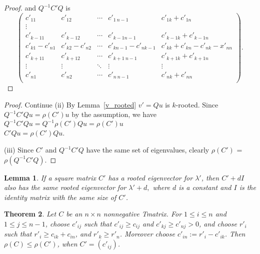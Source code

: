 \documentclass[]{beamer}
\theoremstyle{plain}
\newtheorem{thm}{Theorem}[section]
\newtheorem{lem}[thm]{Lemma}
\theoremstyle{definition}
\begin{document}
\begin{frame}
    \begin{proof}
        and $Q^{-1}C'Q$ is
        $$\begin{pmatrix}
        c'_{11}     & c'_{12} & \cdots     & c'_{1\ n-1} & c'_{1k}+c'_{1n} \\
        \vdots \\
        c'_{k-11}     & c'_{k-1 2}           & \cdots     & c'_{k-1 n-1} & c'_{k-1k}+c'_{k-1n} \\
        c'_{k1}-c'_{n1} & c'_{k2}-c'_{n2} &\cdots      &c'_{kn-1}-c'_{nk-1}& c'_{kk}+c'_{kn}-c'_{nk}-x'_{nn}\\
        c'_{k+11}     & c'_{k+12}           & \cdots     & c'_{k+1\ n-1} & c'_{k+1k}+c'_{k+1n} \\
        \vdots              & \vdots & \ddots              & \vdots & \vdots \\
        c'_{n1}             & c'_{n2} & \cdots             & c'_{n\ n-1} & c'_{nk}+c'_{nn} \\
        \end{pmatrix}.$$
    \end{proof}
\end{frame}

\begin{frame}
    \begin{proof}{Continue}
        (ii)
            By Lemma~\ref{v_rooted} $v'=Qu$ is $k$-rooted.  
            Since $Q^{-1}C'Qu=\rho(C')u$ by the assumption, we have
            $Q^{-1} C' Q u  = Q^{-1} \rho(C') Qu  =\rho(C')u$  \\
            $C'Qu=\rho(C')Qu$.

        (iii)
        Since $C'$ and $Q^{-1}C'Q$ have the same set of eigenvalues, clearly $\rho(C')$ = $\rho(Q^{-1}C'Q)$.

    \end{proof}
\end{frame}

\begin{frame}

\begin{lem}\label{l_diag}
If a square matrix $C'$ has a rooted eigenvector for $\lambda'$, then $C'+dI$ also has
the same rooted eigenvector for $\lambda'+d,$ where $d$ is a constant and $I$ is the identity matrix with the same size of $C'$.
\end{lem}

\end{frame}

\begin{frame}

\begin{thm}
    Let $C$ be an $n\times n$ nonnegative Tmatrix. For $1\leq i \leq n$ and $1\leq j\leq n-1$, choose $c'_{ij}$
    such that $c'_{ij}\geq c_{ij}$ and $c'_{kj}\geq c'_{nj}>0$, and choose $r'_i$ such that $r'_i\geq c_{ik}+c_{in}$, and
    $r'_k \geq r'_n$. Moreover choose $c'_{in}:=r'_i-c'_{ik}$. Then $\rho(C)\leq \rho(C')$, when $C'=(c'_{ij})$.
\end{thm}

\end{frame}
\end{document}
